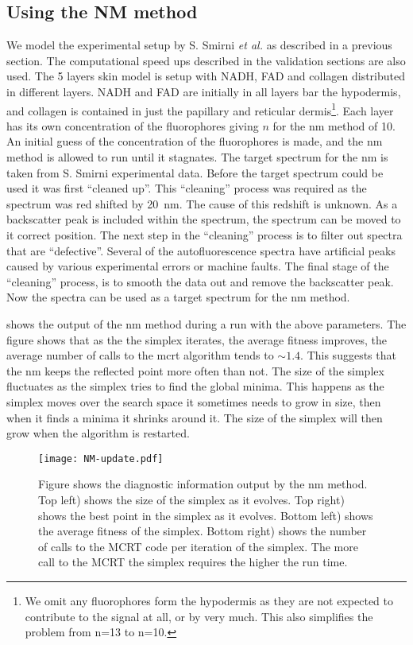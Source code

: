 \subsection*{Using the NM method}

We model the experimental setup by S. Smirni \textit{et al.} as described in a previous section.
The computational speed ups described in the validation sections are also used.
The 5 layers skin model is setup with NADH, FAD and collagen distributed in different layers.
NADH and FAD are initially in all layers bar the hypodermis, and collagen is contained in just the papillary and reticular dermis\footnote{We omit any fluorophores form the hypodermis as they are not expected to contribute to the signal at all, or by very much. This also simplifies the problem from n=13 to n=10.}.
Each layer has its own concentration of the fluorophores giving $n$ for the \gls*{nm} method of 10.
An initial guess of the concentration of the fluorophores is made, and the \gls*{nm} method is allowed to run until it stagnates.
The target spectrum for the \gls*{nm} is taken from S. Smirni experimental data.
Before the target spectrum could be used it was first ``cleaned up''.
This ``cleaning'' process was required as the spectrum was red shifted by 20~nm.
The cause of this redshift is unknown.
As a backscatter peak is included within the spectrum, the spectrum can be moved to it correct position.
The next step in the ``cleaning'' process is to filter out spectra that are ``defective''.
Several of the autofluorescence spectra have artificial peaks caused by various experimental errors or machine faults.
The final stage of the ``cleaning'' process, is to smooth the data out and remove the backscatter peak. 
Now the spectra can be used as a target spectrum for the \gls*{nm} method.

 shows the output of the \gls*{nm} method during a run with the above parameters.
The figure shows that as the the simplex iterates, the average fitness improves, the average number of calls to the \gls*{mcrt} algorithm tends to $\sim 1.4$.
This suggests that the \gls*{nm} keeps the reflected point more often than not.
The size of the simplex fluctuates as the simplex tries to find the global minima.
This happens as the simplex moves over the search space it sometimes needs to grow in size, then when it finds a minima it shrinks around it.
The size of the simplex will then grow when the algorithm is restarted.

\begin{figure}[!htpb]
  \centering
  \texttt{[image: NM-update.pdf]}
  \caption{Figure shows the diagnostic information output by the \gls*{nm} method. Top left) shows the size of the simplex as it evolves. Top right) shows the best point in the simplex as it evolves. Bottom left) shows the average fitness of the simplex. Bottom right) shows the number of calls to the MCRT code per iteration of the simplex. The more call to the MCRT the simplex requires the higher the run time.}
  \label{fig:NMupdate}
\end{figure}

